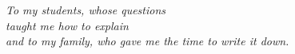 \thispagestyle{empty}
\vspace*{0.28\textheight}
\begin{center}
\itshape\Large
To my students, whose questions\\ taught me how to explain\\[6pt]
and to my family, who gave me the time to write it down.
\end{center}
\clearpage\thispagestyle{empty}\null\clearpage
